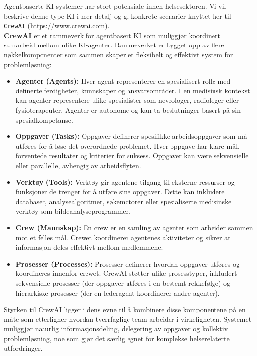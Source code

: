 \vspace{2mm}

Agentbaserte KI-systemer har stort potensiale innen helsesektoren. Vi vil beskrive denne type KI i mer detalj og gi konkrete scenarier knyttet her til \texttt{CrewAI} (\small\url{https://www.crewai.com}).\\


\noindent \textbf{CrewAI} er et rammeverk for agentbasert KI som muliggjør koordinert samarbeid mellom ulike KI-agenter. Rammeverket er bygget opp av flere nøkkelkomponenter som sammen skaper et fleksibelt og effektivt system for problemløsning:

\begin{itemize}
\item \textbf{Agenter (Agents):} Hver agent representerer en spesialisert rolle med definerte ferdigheter, kunnskaper og ansvarsområder. I en medisinsk kontekst kan agenter representere ulike spesialister som nevrologer, radiologer eller fysioterapeuter. Agenter er autonome og kan ta beslutninger basert på sin spesialkompetanse.

\item \textbf{Oppgaver (Tasks):} Oppgaver definerer spesifikke arbeidsoppgaver som må utføres for å løse det overordnede problemet. Hver oppgave har klare mål, forventede resultater og kriterier for suksess. Oppgaver kan være sekvensielle eller parallelle, avhengig av arbeidsflyten.

\item \textbf{Verktøy (Tools):} Verktøy gir agentene tilgang til eksterne ressurser og funksjoner de trenger for å utføre sine oppgaver. Dette kan inkludere databaser, analysealgoritmer, søkemotorer eller spesialiserte medisinske verktøy som bildeanalyseprogrammer.

\item \textbf{Crew (Mannskap):} En crew er en samling av agenter som arbeider sammen mot et felles mål. Crewet koordinerer agentenes aktiviteter og sikrer at informasjon deles effektivt mellom medlemmene.

\item \textbf{Prosesser (Processes):} Prosesser definerer hvordan oppgaver utføres og koordineres innenfor crewet. CrewAI støtter ulike prosesstyper, inkludert sekvensielle prosesser (der oppgaver utføres i en bestemt rekkefølge) og hierarkiske prosesser (der en lederagent koordinerer andre agenter).
\end{itemize}

\noindent Styrken til CrewAI ligger i dens evne til å kombinere disse komponentene på en måte som etterligner hvordan tverrfaglige team arbeider i virkeligheten. Systemet muliggjør naturlig informasjonsdeling, delegering av oppgaver og kollektiv problemløsning, noe som gjør det særlig egnet for komplekse helserelaterte utfordringer.

